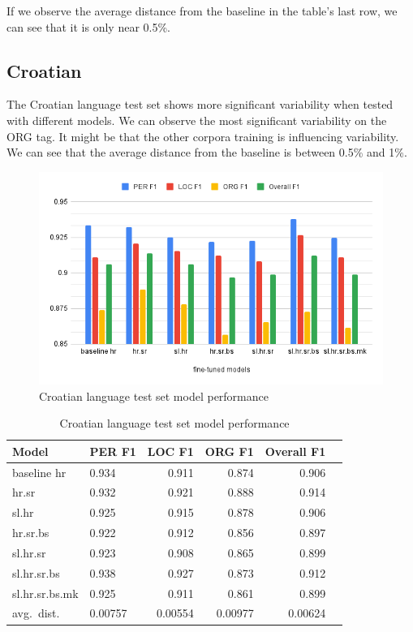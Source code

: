 \documentclass[sigconf]{acmart}
\begin{document}
If we observe the average distance from the baseline in the table's last row, we can see that it is only near 0.5\%.

\subsection{Croatian}
\label{subsec:croatian}

The Croatian language test set shows more significant variability when tested with different models.
We can observe the most significant variability on the ORG tag.
It might be that the other corpora training is influencing variability.
We can see that the average distance from the baseline is between 0.5\% and 1\%.
\begin{figure}[h]
  \centering
  \includegraphics[width=\linewidth]{eval_hr}
  \caption{Croatian language test set model performance}
  \label{fig:eval_hr}
\end{figure}

\begin{table}[H]
  \caption{Croatian language test set model performance}
  \label{tab:eval_hr}
  \begin{tabular}{llrrrr}
    \toprule
    Model&PER F1&LOC F1&ORG F1&Overall F1\\
    \midrule
    baseline hr&0.934&0.911&0.874&0.906\\
    \midrule
    hr.sr&0.932&0.921&0.888&0.914\\
    sl.hr&0.925&0.915&0.878&0.906\\
    hr.sr.bs&0.922&0.912&0.856&0.897\\
    sl.hr.sr&0.923&0.908&0.865&0.899\\
    sl.hr.sr.bs&0.938&0.927&0.873&0.912\\
    sl.hr.sr.bs.mk&0.925&0.911&0.861&0.899\\
    \midrule
    avg.\ dist.&0.00757&0.00554&0.00977&0.00624\\
    \bottomrule
  \end{tabular}
\end{table}
\end{document}
